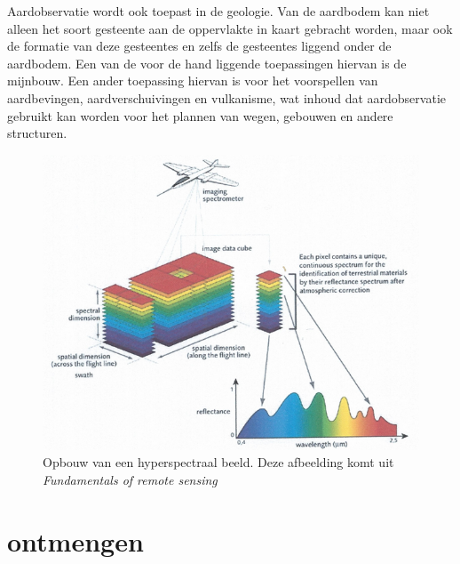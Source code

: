 \documentclass[12pt]{report}
\begin{document}
Aardobservatie wordt ook toepast in de geologie. Van de aardbodem kan niet alleen het soort gesteente aan de oppervlakte in kaart gebracht worden, maar ook de formatie van deze gesteentes en zelfs de gesteentes liggend onder de aardbodem. Een van de voor de hand liggende toepassingen hiervan is de mijnbouw. Een ander toepassing hiervan is voor het voorspellen van aardbevingen, aardverschuivingen en vulkanisme, wat inhoud dat aardobservatie gebruikt kan worden voor het plannen van wegen, gebouwen en andere structuren. 

  
\begin{figure}
\includegraphics[width=\textwidth]{hyp.PNG}
\caption{Opbouw van een hyperspectraal beeld. Deze afbeelding komt uit \textit{Fundamentals of remote sensing\cite{fun}}}
\end{figure}

\chapter{ontmengen}



\end{document}
